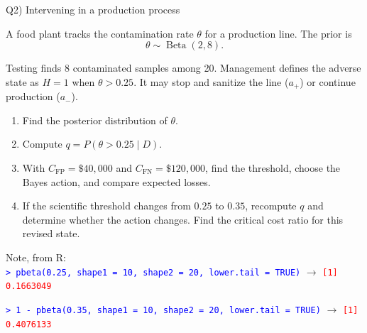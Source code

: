\documentclass[aspectratio=43,10pt]{beamer}
\newcommand{\CFP}{C_{\mathrm{FP}}}
\newcommand{\CFN}{C_{\mathrm{FN}}}
\begin{document}

\begin{frame}{Q2) Intervening in a production process}

  A food plant tracks the contamination rate $\theta$ for a production
  line. The prior is
  \[
  \theta\sim\operatorname{Beta}(2,8).
  \]

  Testing finds 8 contaminated samples among 20. Management defines the
  adverse state as $H=1$ when $\theta>0.25$. It may stop and sanitize the
  line ($a_+$) or continue production ($a_-$).

  \vspace{0.1cm}

  \begin{enumerate}
    \item[a.] Find the posterior distribution of $\theta$.

    \item[b.] Compute $q=P(\theta>0.25\mid D)$.\\

    \item[c.] With $\CFP=\$40{,}000$ and $\CFN=\$120{,}000$, find the
          threshold, choose the Bayes action, and compare expected losses.

    \item[d.] If the scientific threshold changes from $0.25$ to $0.35$,
          recompute $q$ and determine whether the action changes. Find the
          critical cost ratio for this revised state.\\
    		  
  \end{enumerate}

    		  {
		      \scriptsize
              Note, from R:\\
              \textcolor{blue}{\texttt{> pbeta(0.25, shape1 = 10, shape2 = 20, lower.tail = TRUE)}}
              $\rightarrow$ \textcolor{red}{\texttt{[1] 0.1663049}}
              
              \textcolor{blue}{\texttt{> 1 - pbeta(0.35, shape1 = 10, shape2 = 20, lower.tail = TRUE)}}
              $\rightarrow$ \textcolor{red}{\texttt{[1] 0.4076133}}
              }

\end{frame}
\end{document}
